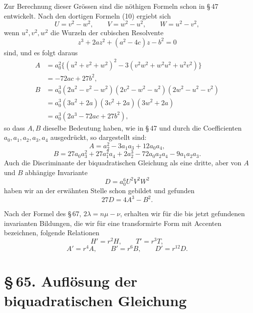 \documentclass[11pt]{article}
\providecommand{\sect}[2]{\section*{\S\,#1. #2}}
\begin{document}
Zur Berechnung dieser Grössen sind die nöthigen Formeln schon in \S\,47 entwickelt. Nach den dortigen Formeln (10) ergiebt sich
\[
 U=v^2-w^2,
 \qquad V=w^2-u^2,
 \qquad W=u^2-v^2,
\]
wenn $u^2,v^2,w^2$ die Wurzeln der cubischen Resolvente
\[
 z^3+2az^2+(a^2-4c)z-b^2=0
\]
sind, und es folgt daraus
\[
\begin{aligned}
 A&=a_0^2\{(u^2+v^2+w^2)^2-3(v^2w^2+w^2u^2+u^2v^2)\}\\
  &=-72ac+27b^2,\\[0.4em]
 B&=a_0^3(2u^2-v^2-w^2)(2v^2-w^2-u^2)(2w^2-u^2-v^2)\\
  &=a_0^3(3u^2+2a)(3v^2+2a)(3w^2+2a)\\
  &=a_0^3(2a^3-72ac+27b^2),
\end{aligned}
\]
so dass $A,B$ dieselbe Bedeutung haben, wie in \S\,47 und durch die Coefficienten $a_0,a_1,a_2,a_3,a_4$ ausgedrückt, so dargestellt sind:
\begin{equation}
 A=a_2^2-3a_1a_3+12a_0a_4,
\tag{8}
\end{equation}
\begin{equation}
 B=27a_0a_3^2+27a_1^2a_4+2a_2^3-72a_0a_2a_4-9a_1a_2a_3.
\tag{9}
\end{equation}
Auch die Discriminante der biquadratischen Gleichung als eine dritte, aber von $A$ und $B$ abhängige Invariante
\begin{equation}
 D=a_0^6U^2V^2W^2
\tag{10}
\end{equation}
haben wir an der erwähnten Stelle schon gebildet und gefunden
\begin{equation}
 27D=4A^3-B^2.
\tag{11}
\end{equation}

Nach der Formel des \S\,67, $2\lambda=n\mu-\nu$, erhalten wir für die bis jetzt gefundenen invarianten Bildungen, die wir für eine transformirte Form mit Accenten bezeichnen, folgende Relationen
\begin{equation}
 H'=r^2H,
 \qquad T'=r^3T,
\tag{12a}
\end{equation}
\begin{equation}
 A'=r^4A,
 \qquad B'=r^6B,
 \qquad D'=r^{12}D.
\tag{12b}
\end{equation}

\sect{65}{Auflösung der biquadratischen Gleichung}
\end{document}
